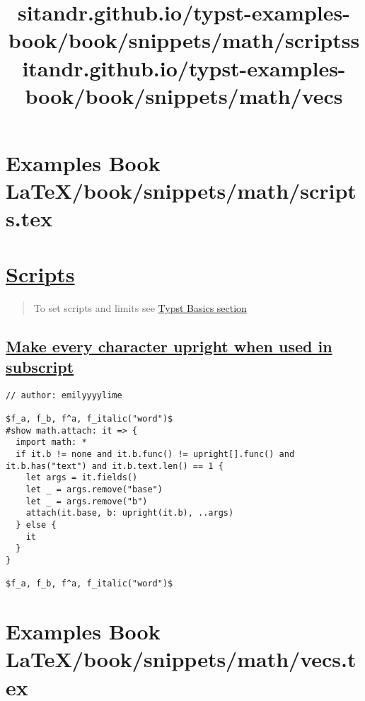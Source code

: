\pandocbounded{}


\section{Examples Book LaTeX/book/snippets/math/scripts.tex}
\title{sitandr.github.io/typst-examples-book/book/snippets/math/scripts}

\section{\texorpdfstring{\hyperref[scripts]{Scripts}}{Scripts}}\label{scripts}

\begin{quote}
To set scripts and limits see \href{../../basics/math/limits.html}{Typst
Basics section}
\end{quote}

\subsection{\texorpdfstring{\hyperref[make-every-character-upright-when-used-in-subscript]{Make
every character upright when used in
subscript}}{Make every character upright when used in subscript}}\label{make-every-character-upright-when-used-in-subscript}

\begin{verbatim}
// author: emilyyyylime

$f_a, f_b, f^a, f_italic("word")$
#show math.attach: it => {
  import math: *
  if it.b != none and it.b.func() != upright[].func() and it.b.has("text") and it.b.text.len() == 1 {
    let args = it.fields()
    let _ = args.remove("base")
    let _ = args.remove("b")
    attach(it.base, b: upright(it.b), ..args)
  } else {
    it
  }
}

$f_a, f_b, f^a, f_italic("word")$
\end{verbatim}

\pandocbounded{}


\section{Examples Book LaTeX/book/snippets/math/vecs.tex}
\title{sitandr.github.io/typst-examples-book/book/snippets/math/vecs}

